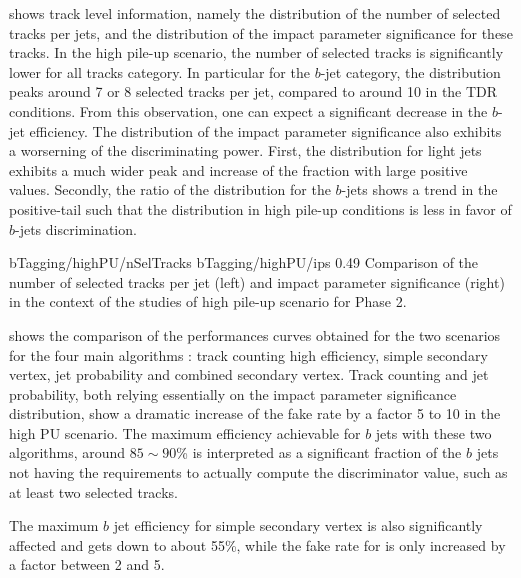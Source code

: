          shows track level information, namely the
        distribution of the number of selected tracks per jets, and the distribution of the
        impact parameter significance for these tracks. In the high pile-up scenario, the
        number of selected tracks is significantly lower for all tracks category. In particular
        for the $b$-jet category, the distribution peaks around 7 or 8 selected tracks per
        jet, compared to around 10 in the TDR conditions. From this observation, one
        can expect a significant decrease in the $b$-jet efficiency. The distribution of
        the impact parameter significance also exhibits a worserning of the discriminating
        power. First, the distribution for light jets exhibits a much wider peak and
        increase of the fraction with large positive values. Secondly, the ratio of the
        distribution for the $b$-jets shows a trend in the positive-tail such that the
        distribution in high pile-up conditions is less in favor of $b$-jets discrimination.

                         {bTagging/highPU/nSelTracks}
                         {bTagging/highPU/ips}
                         {0.49}
                         {Comparison of the number of selected tracks per jet (left) and
                         impact parameter significance (right) in the context of the
                         studies of high pile-up scenario for Phase 2.}

         shows the comparison of the performances curves
        obtained for the two scenarios for the four main algorithms : track counting high
        efficiency, simple secondary vertex, jet probability and combined secondary vertex.
        Track counting and jet probability, both relying essentially on the impact parameter
        significance distribution, show a dramatic increase of the fake rate by a factor
        5 to 10 in the high PU scenario. The maximum efficiency achievable for $b$ jets
        with these two algorithms, around $85\sim90$\% is interpreted as a significant
        fraction of the $b$ jets not having the requirements to actually compute the
        discriminator value, such as at least two selected tracks.

        The maximum $b$ jet efficiency for simple secondary vertex is also significantly
        affected and gets down to about 55\%, while the fake rate for is only increased by
        a factor between 2 and 5.

